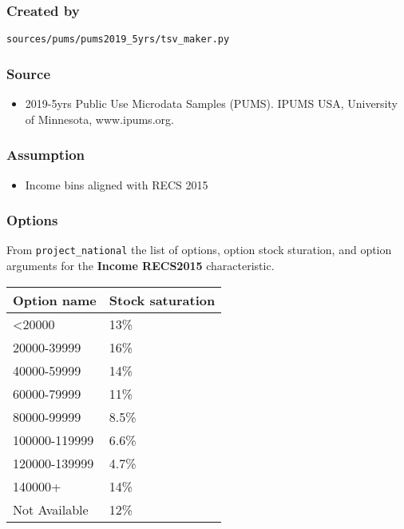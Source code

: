 \subsubsection{Created by}\label{created-by-97}

\texttt{sources/pums/pums2019\_5yrs/tsv\_maker.py}

\subsubsection{Source}\label{source-96}

\begin{itemize}
 
\item
  2019-5yrs Public Use Microdata Samples (PUMS). IPUMS USA, University
  of Minnesota, www.ipums.org.
\end{itemize}

\subsubsection{Assumption}\label{assumption-58}

\begin{itemize}
 
\item
  Income bins aligned with RECS 2015
\end{itemize}

\subsubsection{Options}\label{options-97}

From \texttt{project\_national} the list of options, option stock
sturation, and option arguments for the \textbf{Income RECS2015}
characteristic.

\begin{longtable}[]{@{}ll@{}}
\toprule\noalign{}
Option name & Stock saturation \\
\midrule\noalign{}
\endhead
\bottomrule\noalign{}
\endlastfoot
\textless20000 & 13\% \\
20000-39999 & 16\% \\
40000-59999 & 14\% \\
60000-79999 & 11\% \\
80000-99999 & 8.5\% \\
100000-119999 & 6.6\% \\
120000-139999 & 4.7\% \\
140000+ & 14\% \\
Not Available & 12\% \\
\end{longtable}

